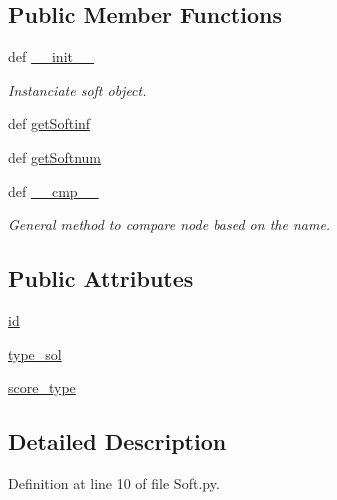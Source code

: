 \subsection*{\-Public \-Member \-Functions}
\begin{DoxyCompactItemize}
\item 
def \hyperlink{classirna_1_1iRNA__stat_1_1Soft_1_1Soft_a212a55019f5b78306a7f927d9793d589}{\-\_\-\-\_\-init\-\_\-\-\_\-}
\begin{DoxyCompactList}\small\item\em \-Instanciate soft object. \end{DoxyCompactList}\item 
def \hyperlink{classirna_1_1iRNA__stat_1_1Soft_1_1Soft_acd94ecef4cc72c47ffa5ad3991c19346}{get\-Softinf}
\item 
def \hyperlink{classirna_1_1iRNA__stat_1_1Soft_1_1Soft_a9a7b9430066e2cf3a4ca6fd22a0d2af5}{get\-Softnum}
\item 
def \hyperlink{classirna_1_1iRNA__stat_1_1Soft_1_1Soft_a1bd85e53c4c81ec349490276a6403b58}{\-\_\-\-\_\-cmp\-\_\-\-\_\-}
\begin{DoxyCompactList}\small\item\em \-General method to compare node based on the name. \end{DoxyCompactList}\end{DoxyCompactItemize}
\subsection*{\-Public \-Attributes}
\begin{DoxyCompactItemize}
\item 
\hyperlink{classirna_1_1iRNA__stat_1_1Soft_1_1Soft_a43921507b7f866555feb252f3e0bf37e}{id}
\item 
\hyperlink{classirna_1_1iRNA__stat_1_1Soft_1_1Soft_a6fa1a7a704486a33c6b30e36156fcad2}{type\-\_\-sol}
\item 
\hyperlink{classirna_1_1iRNA__stat_1_1Soft_1_1Soft_a5e80787ea6485f0158d65f8995ae40ac}{score\-\_\-type}
\end{DoxyCompactItemize}


\subsection{\-Detailed \-Description}


\-Definition at line 10 of file \-Soft.\-py.



